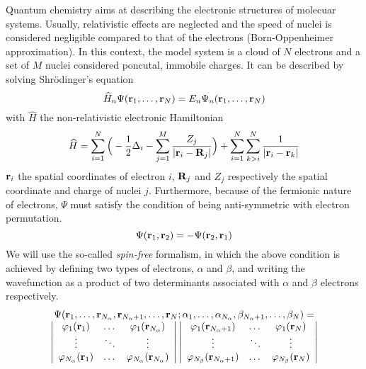 \documentclass[./thesis.tex]{subfiles}
\begin{document}
Quantum chemistry aims at describing the electronic structures of molecuar systems.
Usually, relativistic effects are neglected and the speed of nuclei is considered negligible compared to that of the electrons (Born-Oppenheimer approximation). In this context, the model system is a cloud of $N$ electrons and a set of $M$ nuclei considered poncutal, immobile charges. It can be described by solving Shrödinger's equation
\begin{equation}
 \widehat{H}_n \Psi({\bf r}_1,\dots,{\bf r}_N) = E_n \Psi_n({\bf r}_1,\dots,{\bf r}_N)
\end{equation}
with $\widehat H$ the non-relativistic electronic Hamiltonian
\begin{equation}
\widehat{H} = \sum_{i=1}^{N} \Big ( -\frac{1}{2} \Delta_i - \sum_{j=1}^M \frac{Z_j}{|{\bf r}_i - {\bf R}_j|} \Big ) + \sum_{i=1}^{N} \sum_{k>i}^{N} \frac{1}{|{\bf r}_i - {\bf r}_k|}
\end{equation}
${\bf r}_i$ the spatial coordinates of electron $i$, ${\bf R}_j$ and $Z_j$ respectively the spatial coordinate and charge of nuclei $j$. Furthermore, because of the fermionic nature of electrons, $\Psi$ must satisfy the condition of being anti-symmetric with electron permutation.
\begin{equation}
\Psi({\bf r}_1, {\bf r}_2) = -\Psi({\bf r}_2, {\bf r}_1)
\end{equation}
We will use the so-called \emph{spin-free} formalism, in which the above condition is achieved by defining two types of electrons, $\alpha$ and $\beta$, and writing the wavefunction as a product of two determinants associated with $\alpha$ and $\beta$ electrons respectively.
\begin{equation}
\begin{array}{c}
 \Psi({\bf r}_1,\dots,{\bf r}_{{N_\alpha}},{\bf r}_{{N_\alpha}+1},\dots,{\bf r}_N;
      \alpha_1,\dots,\alpha_{{N_\alpha}},\beta_{{N_\alpha}+1},\dots,\beta_N) = \\
\left|
 \begin{array}{ccc}
 \varphi_1({\bf r}_1) & \dots & \varphi_1({\bf r}_{{N_\alpha}}) \\
 \vdots               & \ddots &   \vdots             \\
 \varphi_{{N_\alpha}}({\bf r}_1) & \dots & \varphi_{{N_\alpha}}({\bf r}_{{N_\alpha}}) \\
 \end{array}
\right|
\left|
 \begin{array}{ccc}
 \varphi_1({\bf r}_{{N_\alpha}+1}) & \dots & \varphi_1({\bf r}_{N}) \\
 \vdots               & \ddots &   \vdots             \\
 \varphi_{N_\beta}({\bf r}_{{N_\alpha}+1}) & \dots & \varphi_{N_\beta}({\bf r}_{N}) \\
 \end{array}
\right|
\end{array} 
\label{eq:slater}
\end{equation}
\end{document}
